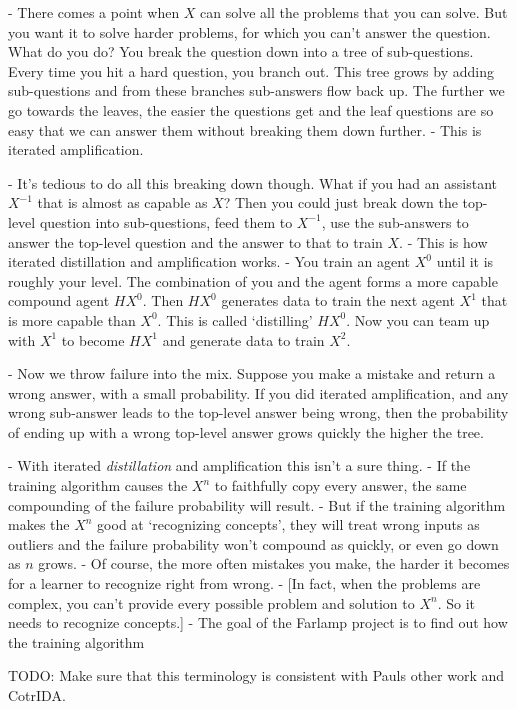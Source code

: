 \documentclass{farlamp}
\begin{document}
- There comes a point when $X$ can solve all the problems that you can solve.
But you want it to solve harder problems, for which you can't answer the
question. What do you do? You break the question down into a tree of
sub-questions. Every time you hit a hard question, you branch out. This tree
grows by adding sub-questions and from these branches sub-answers flow back up.
The further we go towards the leaves, the easier the questions get and the leaf
questions are so easy that we can answer them without breaking them down
further.
- This is iterated amplification.

- It's tedious to do all this breaking down though. What if you had an
assistant $X^{-1}$ that is almost as capable as $X$? Then you could just break down the
top-level question into sub-questions, feed them to $X^{-1}$, use the
sub-answers to answer the top-level question and the answer to that to train
$X$.
- This is how iterated distillation and amplification works.
- You train an agent $X^0$ until it is roughly your level. The combination of
you and the agent forms a more capable compound agent $HX^0$. Then $HX^0$
generates data to train the next agent $X^1$ that is more capable than $X^0$.
This is called ‘distilling’ $HX^0$. Now you can team up with $X^1$ to become
$HX^1$ and generate data to train $X^2$.

- Now we throw failure into the mix. Suppose you make a mistake and return a
wrong answer, with a small probability. If you did iterated amplification, and
any wrong sub-answer leads to the top-level answer being wrong, then the
probability of ending up with a wrong top-level answer grows quickly the higher
the tree.

- With iterated \emph{distillation} and amplification this isn't a sure thing.
- If the training algorithm causes the $X^n$ to faithfully copy every
answer, the same compounding of the failure probability will result.
- But if the training algorithm makes the $X^n$ good at ‘recognizing concepts’,
they will treat wrong inputs as outliers and the failure probability won't
compound as quickly, or even go down as $n$ grows.
- Of course, the more often mistakes you make, the harder it becomes for a
learner to recognize right from wrong.
- [In fact, when the problems are complex, you can't provide every possible
problem and solution to $X^n$. So it needs to recognize concepts.]
- The goal of the Farlamp project is to find out how the training algorithm


TODO: Make sure that this terminology is consistent with Pauls other work and
CotrIDA.
\end{document}
